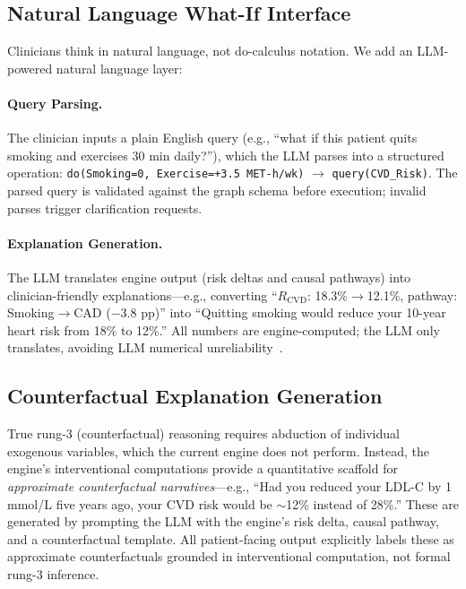 \documentclass[runningheads]{llncs}
\begin{document}
\subsection{Natural Language What-If Interface}\label{sec:llminterface}

Clinicians think in natural language, not do-calculus notation.
We add an LLM-powered natural language layer:

\paragraph{Query Parsing.}
The clinician inputs a plain English query (e.g., ``what if this
patient quits smoking and exercises 30 min daily?''), which the LLM
parses into a structured operation:
\texttt{do(Smoking=0, Exercise=+3.5 MET-h/wk)} $\to$
\texttt{query(CVD\_Risk)}.
The parsed query is validated against the graph schema before
execution; invalid parses trigger clarification requests.

\paragraph{Explanation Generation.}
The LLM translates engine output (risk deltas and causal pathways)
into clinician-friendly explanations---e.g., converting
``$R_{\text{CVD}}$: 18.3\%$\to$12.1\%, pathway:
Smoking$\to$CAD ($-$3.8 pp)'' into ``Quitting smoking would reduce
your 10-year heart risk from 18\% to 12\%.''
All numbers are engine-computed; the LLM only translates,
avoiding LLM numerical unreliability~\cite{jin2023cladder}.

\subsection{Counterfactual Explanation Generation}\label{sec:counterfactual}

True rung-3 (counterfactual) reasoning requires abduction of
individual exogenous variables, which the current engine does not
perform.
Instead, the engine's interventional computations provide a
quantitative scaffold for \emph{approximate counterfactual
narratives}---e.g., ``Had you reduced your LDL-C by 1\,mmol/L
five years ago, your CVD risk would be ${\sim}$12\% instead of
28\%.''
These are generated by prompting the LLM with the engine's risk
delta, causal pathway, and a counterfactual template.
All patient-facing output explicitly labels these as approximate
counterfactuals grounded in interventional computation, not formal
rung-3 inference.
\end{document}

